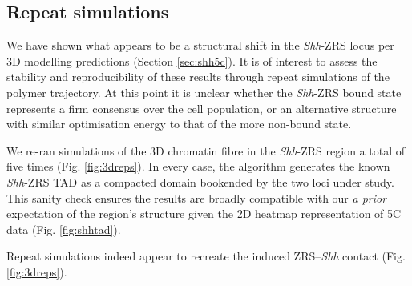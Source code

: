 \documentclass[a4paper,11pt,oneside]{book}
\begin{document}
\subsection{Repeat simulations}

We have shown what appears to be a structural shift in the \emph{Shh}-ZRS locus per 3D modelling predictions (Section \ref{sec:shh5c}). It is of interest to assess the stability and reproducibility of these results through repeat simulations of the polymer trajectory. At this point it is unclear whether the \emph{Shh}-ZRS bound state represents a firm consensus over the cell population, or an alternative structure with similar optimisation energy to that of the more non-bound state. 


We re-ran simulations of the 3D chromatin fibre in the \emph{Shh}-ZRS region a total of five times (Fig. \ref{fig:3dreps}). In every case, the algorithm generates the known \emph{Shh}-ZRS TAD as a compacted domain bookended by the two loci under study. This sanity check ensures the results are broadly compatible with our \emph{a prior} expectation of the region's structure given the 2D heatmap representation of 5C data (Fig. \ref{fig:shhtad}).

Repeat simulations indeed appear to recreate the induced ZRS--\emph{Shh} contact (Fig. \ref{fig:3dreps}).
\end{document}
